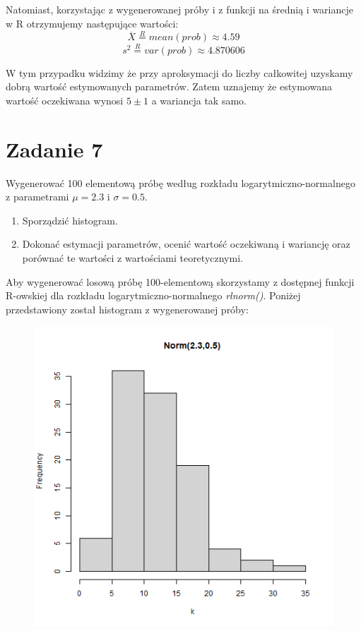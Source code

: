 \documentclass{article}
\begin{document}
Natomiast, korzystając z wygenerowanej próby i z funkcji na średnią i wariancje w R otrzymujemy następujące wartości:
\[ \overline{X} \overset{R}{=} mean(prob) \approx 4.59 \]
\[ s^2 \overset{R}{=} var(prob) \approx 4.870606 \]

W tym przypadku widzimy że przy aproksymacji do liczby całkowitej uzyskamy dobrą wartość estymowanych parametrów. Zatem uznajemy że estymowana wartość oczekiwana wynosi $5 \pm 1$ a wariancja tak samo.

\newpage
\section{Zadanie 7}
Wygenerować 100 elementową próbę według rozkładu logarytmiczno-normalnego z parametrami $\mu = 2.3$ i $\sigma = 0.5$.
\begin{enumerate}[label = \alph*)]
\item Sporządzić histogram.
\item Dokonać estymacji parametrów, ocenić wartość oczekiwaną i wariancję oraz porównać te wartości z wartościami teoretycznymi.
\end{enumerate}

Aby wygenerować losową próbę 100-elementową skorzystamy z dostępnej funkcji R-owskiej dla rozkładu logarytmiczno-normalnego \textit{rlnorm()}. Poniżej przedstawiony został histogram z wygenerowanej próby:
\begin{figure}[h!]
\begin{center}
\includegraphics[height = 0.5\textheight, angle = 0]{"lab7zad7.png"}
\end{center}
\end{figure}
\end{document}
